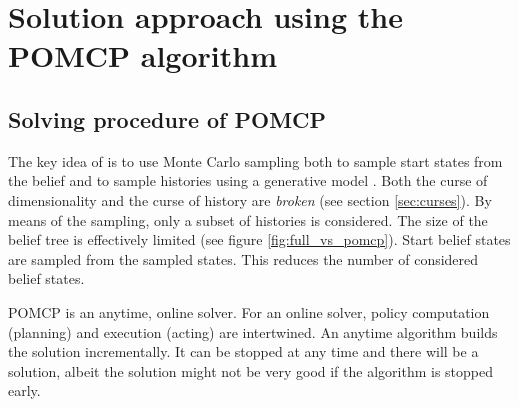\section{Solution approach using the POMCP algorithm}

\subsection{Solving procedure of POMCP}
\label{sec:pomcp}


The key idea of  is to use Monte Carlo sampling both to sample start states from the belief and to sample histories using a generative model \parencite{pomcp}. Both the curse of dimensionality and the curse of history are \emph{broken} (see section \ref{sec:curses}). By means of the sampling, only a subset of histories is considered. The size of the belief tree is effectively limited (see figure \ref{fig:full_vs_pomcp}). Start belief states are sampled from the sampled states. This reduces the number of considered belief states.

POMCP is an anytime, online solver. For an online solver, policy computation (planning) and execution (acting) are intertwined. An anytime algorithm builds the solution incrementally. It can be stopped at any time and there will be a solution, albeit the solution might not be very good if the algorithm is stopped early.


